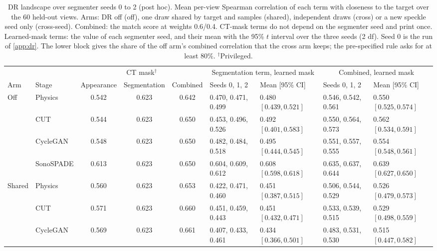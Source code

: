 \begin{table}[tp]
\renewcommand{\baselinestretch}{1}\scriptsize
\caption{DR landscape over segmenter seeds 0 to 2 (post hoc). Mean per-view Spearman correlation of each term with closeness to the target over the 60 held-out views. Arms: DR off (off), one draw shared by target and samples (shared), independent draws (cross) or a new speckle seed only (cross-seed). Combined: the match score at weights 0.6/0.4. CT-mask terms do not depend on the segmenter seed and print once. Learned-mask terms: the value of each segmenter seed, and their mean with the 95\% $t$ interval over the three seeds (2 df). Seed 0 is the run of \ref{app:dr}. The lower block gives the share of the off arm's combined correlation that the cross arm keeps; the pre-specified rule asks for at least 80\%. $^{\dagger}$Privileged.}
\label{tab:posthoc-dr-landscape}
\centering
\setlength{\tabcolsep}{3pt}
\begin{tabular}{@{}l l c c c l l l l@{}}
\toprule
 & & \multicolumn{3}{c}{CT mask$^{\dagger}$} & \multicolumn{2}{c}{Segmentation term, learned mask} & \multicolumn{2}{c}{Combined, learned mask} \\
\cmidrule(lr){3-5}\cmidrule(lr){6-7}\cmidrule(lr){8-9}
Arm & Stage & Appearance & Segmentation & Combined & Seeds 0, 1, 2 & Mean [95\% CI] & Seeds 0, 1, 2 & Mean [95\% CI] \\
\midrule
Off & Physics & 0.542 & 0.623 & 0.642 & 0.470, 0.471, 0.499 & 0.480 $[0.439, 0.521]$ & 0.546, 0.542, 0.561 & 0.550 $[0.525, 0.574]$ \\
 & CUT & 0.544 & 0.623 & 0.650 & 0.453, 0.496, 0.526 & 0.492 $[0.401, 0.583]$ & 0.550, 0.564, 0.573 & 0.562 $[0.534, 0.591]$ \\
 & CycleGAN & 0.548 & 0.623 & 0.650 & 0.482, 0.484, 0.518 & 0.495 $[0.444, 0.545]$ & 0.551, 0.557, 0.555 & 0.554 $[0.548, 0.561]$ \\
 & SonoSPADE & 0.613 & 0.623 & 0.650 & 0.604, 0.609, 0.612 & 0.608 $[0.598, 0.618]$ & 0.635, 0.637, 0.644 & 0.639 $[0.627, 0.650]$ \\
\addlinespace
Shared & Physics & 0.560 & 0.623 & 0.653 & 0.422, 0.471, 0.460 & 0.451 $[0.387, 0.515]$ & 0.506, 0.544, 0.529 & 0.526 $[0.479, 0.573]$ \\
 & CUT & 0.571 & 0.623 & 0.660 & 0.451, 0.459, 0.443 & 0.451 $[0.432, 0.471]$ & 0.533, 0.539, 0.515 & 0.529 $[0.498, 0.559]$ \\
 & CycleGAN & 0.569 & 0.623 & 0.661 & 0.407, 0.433, 0.461 & 0.434 $[0.366, 0.501]$ & 0.483, 0.531, 0.530 & 0.515 $[0.447, 0.582]$ \\

\end{tabular}
\end{table}
